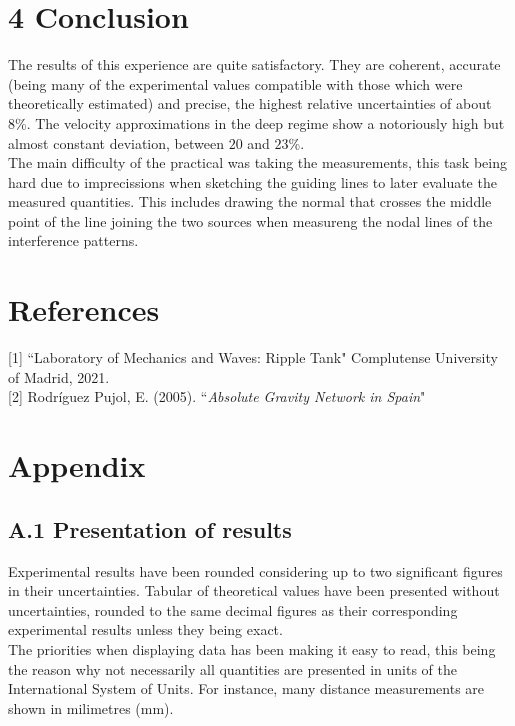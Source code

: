 \documentclass[a4paper, 12pt]{article}
\begin{document}
	\section{4 Conclusion}
	The results of this experience are quite satisfactory. They are coherent, accurate (being many of the experimental values compatible with those which were theoretically estimated) and precise, the highest relative uncertainties of about 8\%. The velocity approximations in the deep regime show a notoriously high but almost constant deviation, between $20$ and $23 \%$.\\
	
The main difficulty of the practical was taking the measurements, this task being hard due to imprecissions when sketching the guiding lines to later evaluate the measured quantities. This includes drawing the normal that crosses the middle point of the line joining the two sources when measureng the nodal lines of the interference patterns.
	\section{References}
	[1] ``Laboratory of Mechanics and Waves: Ripple Tank" Complutense University of Madrid, 2021.\\
	
	[2] Rodríguez Pujol, E. (2005). ``\textit{Absolute Gravity Network in Spain}" %
	
	\newpage
	
	\section{Appendix}

	\subsection{A.1 Presentation of results}
	Experimental results have been rounded considering up to two significant figures in their uncertainties. Tabular of theoretical values have been presented without uncertainties, rounded to the same decimal figures as their corresponding experimental results unless they being exact.\\
	
	The priorities when displaying data has been making it easy to read, this being the reason why not necessarily all quantities are presented in units of the International System of Units. For instance, many distance measurements are shown in milimetres (mm). \\
\end{document}

